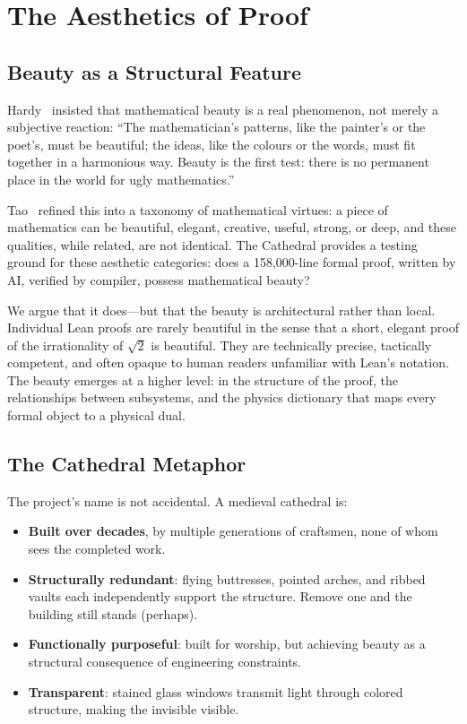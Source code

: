 \section{The Aesthetics of Proof}
\label{sec:aesthetics}

\subsection{Beauty as a Structural Feature}

Hardy~\cite{hardy1940} insisted that mathematical beauty is a real
phenomenon, not merely a subjective reaction: ``The mathematician's
patterns, like the painter's or the poet's, must be beautiful; the
ideas, like the colours or the words, must fit together in a
harmonious way. Beauty is the first test: there is no permanent
place in the world for ugly mathematics.''

Tao~\cite{tao2007} refined this into a taxonomy of mathematical
virtues: a piece of mathematics can be beautiful, elegant,
creative, useful, strong, or deep, and these qualities,
while related, are not identical. The Cathedral provides a
testing ground for these aesthetic categories: does a
158{,}000-line formal proof, written by AI, verified by
compiler, possess mathematical beauty?

We argue that it does---but that the beauty is architectural rather
than local. Individual Lean proofs are rarely beautiful in the
sense that a short, elegant proof of the irrationality of
$\sqrt{2}$ is beautiful. They are technically precise,
tactically competent, and often opaque to human readers unfamiliar
with Lean's notation. The beauty emerges at a higher level: in
the structure of the proof, the relationships between subsystems,
and the physics dictionary that maps every formal object to a
physical dual.

\subsection{The Cathedral Metaphor}

The project's name is not accidental. A medieval cathedral is:

\begin{itemize}
  \item \textbf{Built over decades}, by multiple generations of
    craftsmen, none of whom sees the completed work.
  \item \textbf{Structurally redundant}: flying buttresses,
    pointed arches, and ribbed vaults each independently
    support the structure. Remove one and the building still
    stands (perhaps).
  \item \textbf{Functionally purposeful}: built for worship,
    but achieving beauty as a structural consequence of
    engineering constraints.
  \item \textbf{Transparent}: stained glass windows
    transmit light through colored structure, making the
    invisible visible.
\end{itemize}

